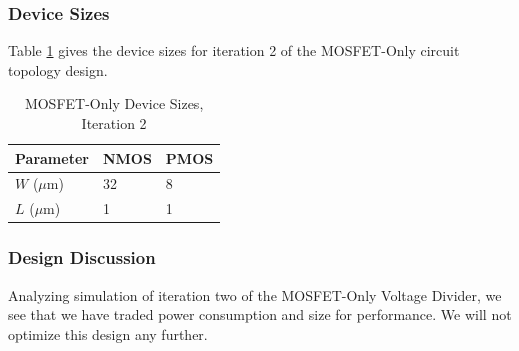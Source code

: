 \documentclass[conference]{IEEEtran}
\begin{document}
\subsubsection{Device Sizes}
Table \ref{tab:mo-ds-2} gives the device sizes for iteration 2 of the MOSFET-Only circuit topology design.
\begin{table}[!htbp]
  \caption[]{MOSFET-Only Device Sizes, Iteration 2}
  \label{tab:mo-ds-2}
  \centering
  \begin{tabular}{|l|l|l|}
    \hline
    Parameter			& NMOS	&PMOS \\ \hline
    $W$ ($\mu$m)		&32		&8\\ 
    $L$ ($\mu$m)		& 1		&1\\
    \hline
  \end{tabular}
\end{table}
\subsubsection{Design Discussion}
Analyzing simulation of iteration two of the MOSFET-Only Voltage Divider, we see that we have traded power consumption and size for performance.  We will not optimize this design any further.\\
\end{document}
